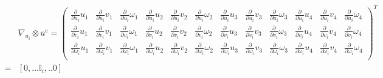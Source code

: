 \documentclass[a4paper,12pt]{article}
\begin{document}
\begin{align}
& \nabla_{\overline{u_i}} \otimes \overline{u}^e =\begin{pmatrix}
    \frac{\partial}{\partial u_i} u_1 & \frac{\partial}{\partial u_i} v_1 & \frac{\partial}{\partial u_i} \omega_1 &\frac{\partial}{\partial u_i} u_2 & \frac{\partial}{\partial u_i} v_2 & \frac{\partial}{\partial u_i} \omega_2 &\frac{\partial}{\partial u_i} u_3 & \frac{\partial}{\partial u_i} v_3 & \frac{\partial}{\partial u_i} \omega_3 &\frac{\partial}{\partial u_i} u_4 & \frac{\partial}{\partial u_i} v_4 & \frac{\partial}{\partial u_i} \omega_4 \\
    \frac{\partial}{\partial v_i} u_1 & \frac{\partial}{\partial v_i} v_1 & \frac{\partial}{\partial v_i} \omega_1 &\frac{\partial}{\partial v_i} u_2 & \frac{\partial}{\partial v_i} v_2 & \frac{\partial}{\partial v_i} \omega_2 &\frac{\partial}{\partial v_i} u_3 & \frac{\partial}{\partial v_i} v_3 & \frac{\partial}{\partial v_i} \omega_3 &\frac{\partial}{\partial v_i} u_4 & \frac{\partial}{\partial v_i} v_4 & \frac{\partial}{\partial v_i} \omega_4 \\
    \frac{\partial}{\partial \omega_i} u_1 & \frac{\partial}{\partial \omega_i} v_1 & \frac{\partial}{\partial \omega_i} \omega_1 &\frac{\partial}{\partial \omega_i} u_2 & \frac{\partial}{\partial \omega_i} v_2 & \frac{\partial}{\partial \omega_i} \omega_2 &\frac{\partial}{\partial \omega_i} u_3 & \frac{\partial}{\partial \omega_i} v_3 & \frac{\partial}{\partial \omega_i} \omega_3 &\frac{\partial}{\partial \omega_i} u_4 & \frac{\partial}{\partial \omega_i} v_4 & \frac{\partial}{\partial \omega_i} \omega_4\\
    \end{pmatrix}^T \\
    = &[0,...\mathbb{I}_i,..0]
\end{align}
    
\end{document}
